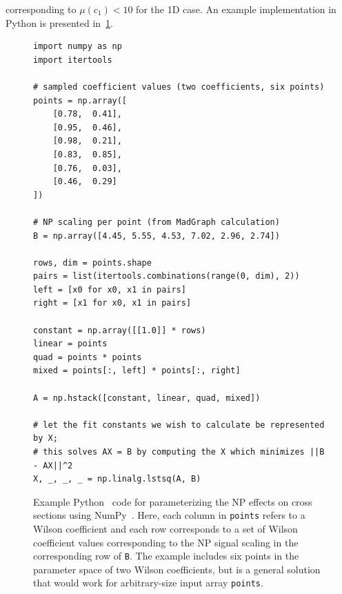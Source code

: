 corresponding to $\mu(c_1) < 10$ for the 1D case. An example implementation in
Python is presented in~\cref{fig:code}.
\begin{figure}
  \small
  \begin{verbatim}
import numpy as np
import itertools

# sampled coefficient values (two coefficients, six points)
points = np.array([
    [0.78,  0.41],
    [0.95,  0.46],
    [0.98,  0.21],
    [0.83,  0.85],
    [0.76,  0.03],
    [0.46,  0.29]
])

# NP scaling per point (from MadGraph calculation)
B = np.array([4.45, 5.55, 4.53, 7.02, 2.96, 2.74])

rows, dim = points.shape
pairs = list(itertools.combinations(range(0, dim), 2))
left = [x0 for x0, x1 in pairs]
right = [x1 for x0, x1 in pairs]

constant = np.array([[1.0]] * rows)
linear = points
quad = points * points
mixed = points[:, left] * points[:, right]

A = np.hstack([constant, linear, quad, mixed])

# let the fit constants we wish to calculate be represented by X;
# this solves AX = B by computing the X which minimizes ||B - AX||^2
X, _, _, _ = np.linalg.lstsq(A, B)
  \end{verbatim}
  \caption[Example code for multidimensional fitting]{
    Example Python~\cite{python2.7} code for parameterizing the NP effects on cross sections using NumPy~\cite{numpy2011}. Here, each column in \texttt{points} refers to a Wilson coefficient and each row corresponds to a set of Wilson coefficient values corresponding to the NP signal scaling in the corresponding row of \texttt{B}. The example includes six points in the parameter space of two Wilson coefficients, but is a general solution that would work for arbitrary-size input array \texttt{points}.
    \label{fig:code}
  }
\end{figure}

